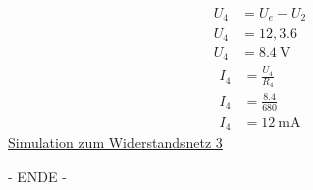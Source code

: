 \documentclass[12pt,a4paper]{amsart}
\begin{document}
\begin{align*}
  U_4&=U_e-U_2\\
  U_4&=12,3.6\\
  U_4&= \qty{8.4}{\volt}
\end{align*}
\begin{align*}
  I_4&=\frac{U_4}{R_4}\\
  I_4&=\frac{8.4}{680}\\
  I_4&= \qty{12}{\mA}
\end{align*}
\href{https://www.falstad.com/circuit/circuitjs.html?ctz=CQAgjCAMB0l3BWKIAsB2ESUGZMFMBaMMAKADdwA2EbSFK8FeyZFFsAJmRZgRICcQATmpgmw6rWYgOHGPAWLI2ATI70x9WVsgAOZJ0irtMvWvpTklXUcFhKLOfvstLLdEYDuEmnQZuSbxdTfRMnKBJsNHZRcRFGDW5I6J9NcwTwJKjHdV8NBzzMnkCqVz94gKA}{Simulation zum Widerstandsnetz 3}

\begin{center}
  - ENDE -
  \end{center}
\end{document}
